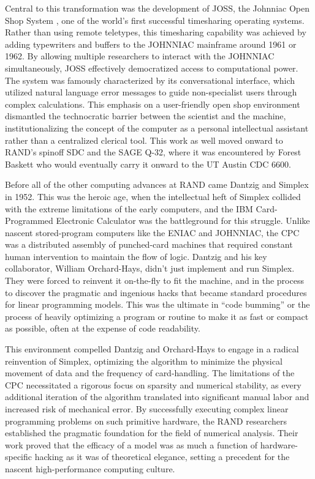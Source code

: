 Central to this transformation was the development of JOSS, the Johnniac Open Shop System , one of the world's first successful timesharing operating systems. Rather than using remote teletypes, this timesharing capability was achieved by adding typewriters and buffers to the JOHNNIAC mainframe around 1961 or 1962. By allowing multiple researchers to interact with the JOHNNIAC simultaneously, JOSS effectively democratized access to computational power. The system was famously characterized by its conversational interface, which utilized natural language error messages to guide non-specialist users through complex calculations. This emphasis on a user-friendly open shop environment dismantled the technocratic barrier between the scientist and the machine, institutionalizing the concept of the computer as a personal intellectual assistant rather than a centralized clerical tool. This work as well moved onward to RAND’s spinoff SDC and the SAGE Q-32, where it was encountered by Forest Baskett who would eventually carry it onward to the UT Austin CDC 6600.

Before all of the other computing advances at RAND came Dantzig and Simplex in 1952. This was the heroic age, when the intellectual heft of Simplex collided with the extreme limitations of the early computers, and the IBM Card-Programmed Electronic Calculator was the battleground for this struggle. Unlike nascent stored-program computers like the ENIAC and JOHNNIAC, the CPC was a distributed assembly of punched-card machines that required constant human intervention to maintain the flow of logic. Dantzig and his key collaborator, William Orchard-Hays, didn't just implement and run Simplex. They were forced to reinvent it on-the-fly to fit the machine, and in the process to discover the pragmatic and ingenious hacks that became standard procedures for linear programming models. This was the ultimate in “code bumming” or the process of heavily optimizing a program or routine to make it as fast or compact as possible, often at the expense of code readability.

This environment compelled Dantzig and Orchard-Hays to engage in a radical reinvention of Simplex, optimizing the algorithm to minimize the physical movement of data and the frequency of card-handling. The limitations of the CPC necessitated a rigorous focus on sparsity and numerical stability, as every additional iteration of the algorithm translated into significant manual labor and increased risk of mechanical error. By successfully executing complex linear programming problems on such primitive hardware, the RAND researchers established the pragmatic foundation for the field of numerical analysis. Their work proved that the efficacy of a model was as much a function of hardware-specific hacking as it was of theoretical elegance, setting a precedent for the nascent high-performance computing culture.

